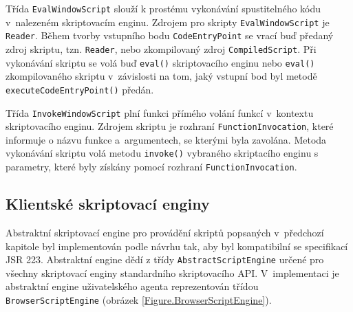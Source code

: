 Třída \texttt{EvalWindowScript} slouží k prostému vykonávání spustitelného kódu v~nalezeném skriptovacím enginu. Zdrojem pro skripty \texttt{EvalWindowScript} je \texttt{Reader}. Během tvorby vstupního bodu \texttt{CodeEntryPoint} se vrací buď předaný zdroj skriptu, tzn. \texttt{Reader}, nebo zkompilovaný zdroj \texttt{CompiledScript}. Při vykonávání skriptu se volá buď \texttt{eval()} skriptovacího enginu nebo \texttt{eval()} zkompilovaného skriptu v~závislosti na tom, jaký vstupní bod byl metodě \texttt{executeCodeEntryPoint()} předán.

Třída \texttt{InvokeWindowScript} plní funkci přímého volání funkcí v~kontextu skriptovacího enginu. Zdrojem skriptu je rozhraní \texttt{FunctionInvocation}, které informuje o názvu funkce a~argumentech, se kterými byla zavolána. Metoda vykonávání skriptu volá metodu \texttt{invoke()} vybraného skriptacího enginu s parametry, které byly získány pomocí rozhraní \texttt{FunctionInvocation}.

\subsection{Klientské skriptovací enginy}
\label{Chapter.Implementation.ScriptEngines}

Abstraktní skriptovací engine pro provádění skriptů popsaných v~předchozí kapitole byl implementován podle návrhu tak, aby byl kompatibilní se specifikací JSR 223. Abstraktní engine dědí z třídy \texttt{AbstractScriptEngine} určené pro všechny skriptovací enginy standardního skriptovacího API. V~implementaci je abstraktní engine uživatelského agenta reprezentován třídou \texttt{BrowserScriptEngine} (obrázek \ref{Figure.BrowserScriptEngine}).

